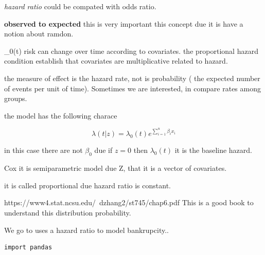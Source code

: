 \documentclass[10pt,a4paper]{article}
\begin{document}
\textit{hazard ratio} could be compated with odds ratio.

\textbf{observed to expected} this is very important this concept due 
it is have a notion about ramdon.

\lambd_{0}(t)  risk can change over time according to covariates.
the proportional hazard condition establish that covariates are multiplicative related to 
hazard. 

the measure of effect is the hazard rate, not is probability ( the expected number of events per unit of time). 
Sometimes we are interested, in compare rates among groups. 

the model has the following charace

$$\lambda(t|z)= \lambda_{0}(t) e^{\sum_{i=1}^{n} \beta_{i} x_{i}}$$

in this case there are not $\beta_{0}$ due if $z=0$ then $\lambda_{0}(t)$ it is the baseline hazard.

Cox it is semiparametric model due Z, that it is a vector of covariates.

it is called proportional due
hazard ratio is constant.

https://www4.stat.ncsu.edu/~dzhang2/st745/chap6.pdf  This is a good book to understand this distribution
probability.

We go to uses a hazard ratio to model bankrupcity.. 



\begin{lstlisting}
import pandas
\end{lstlisting}
\end{document}

